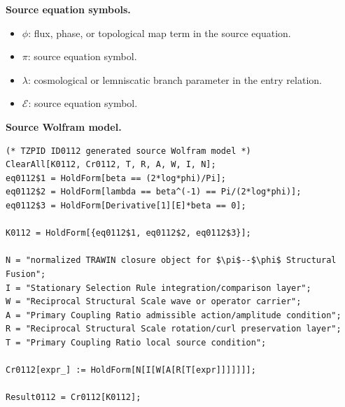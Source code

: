 \begin{minipage}[t]{0.49\linewidth}
\begingroup
\small
\raggedright
\textbf{Source equation symbols.}\par
\begin{itemize}[leftmargin=1.35em,itemsep=1pt,topsep=1pt,parsep=0pt]
    \item $\phi$: flux, phase, or topological map term in the source equation.
    \item $\pi$: source equation symbol.
    \item $\lambda$: cosmological or lemniscatic branch parameter in the entry relation.
    \item $\mathcal{E}$: source equation symbol.
\end{itemize}
\endgroup
\end{minipage}\hfill
\begin{minipage}[t]{0.47\linewidth}
\begingroup
\scriptsize
\raggedright
\textbf{Source Wolfram model.}\par
\begin{Verbatim}[fontsize=\tiny,breaklines=true,breakanywhere=true]
(* TZPID ID0112 generated source Wolfram model *)
ClearAll[K0112, Cr0112, T, R, A, W, I, N];
eq0112$1 = HoldForm[beta == (2*log*phi)/Pi];
eq0112$2 = HoldForm[lambda == beta^(-1) == Pi/(2*log*phi)];
eq0112$3 = HoldForm[Derivative[1][E]*beta == 0];

K0112 = HoldForm[{eq0112$1, eq0112$2, eq0112$3}];

N = "normalized TRAWIN closure object for $\pi$--$\phi$ Structural Fusion";
I = "Stationary Selection Rule integration/comparison layer";
W = "Reciprocal Structural Scale wave or operator carrier";
A = "Primary Coupling Ratio admissible action/amplitude condition";
R = "Reciprocal Structural Scale rotation/curl preservation layer";
T = "Primary Coupling Ratio local source condition";

Cr0112[expr_] := HoldForm[N[I[W[A[R[T[expr]]]]]]];

Result0112 = Cr0112[K0112];
\end{Verbatim}
\endgroup
\end{minipage}

